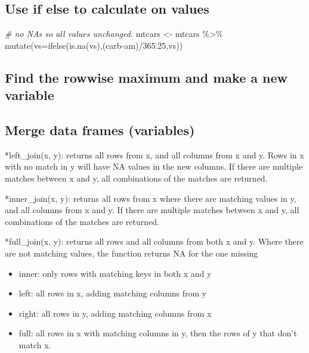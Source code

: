 \documentclass[
]{article}
\newenvironment{Shaded}{\begin{snugshade}}{\end{snugshade}}
\newcommand{\AttributeTok}[1]{\textcolor[rgb]{0.77,0.63,0.00}{#1}}
\newcommand{\CommentTok}[1]{\textcolor[rgb]{0.56,0.35,0.01}{\textit{#1}}}
\newcommand{\FloatTok}[1]{\textcolor[rgb]{0.00,0.00,0.81}{#1}}
\newcommand{\FunctionTok}[1]{\textcolor[rgb]{0.00,0.00,0.00}{#1}}
\newcommand{\NormalTok}[1]{#1}
\newcommand{\OtherTok}[1]{\textcolor[rgb]{0.56,0.35,0.01}{#1}}
\newcommand{\SpecialCharTok}[1]{\textcolor[rgb]{0.00,0.00,0.00}{#1}}
\providecommand{\tightlist}{%
  \setlength{\itemsep}{0pt}\setlength{\parskip}{0pt}}
\begin{document}
\hypertarget{use-if-else-to-calculate-on-values}{%
\subsection{Use if else to calculate on values}\label{use-if-else-to-calculate-on-values}}

\begin{Shaded}
\begin{Highlighting}[]
\CommentTok{\# no NA\textquotesingle{}s so all values unchanged.}
\NormalTok{mtcars }\OtherTok{\textless{}{-}}\NormalTok{ mtcars }\SpecialCharTok{\%\textgreater{}\%} \FunctionTok{mutate}\NormalTok{(}\AttributeTok{vs=}\FunctionTok{ifelse}\NormalTok{(}\FunctionTok{is.na}\NormalTok{(vs),(carb}\SpecialCharTok{{-}}\NormalTok{am)}\SpecialCharTok{/}\FloatTok{365.25}\NormalTok{,vs)) }
\end{Highlighting}
\end{Shaded}

\hypertarget{find-the-rowwise-maximum-and-make-a-new-variable}{%
\subsection{Find the rowwise maximum and make a new variable}\label{find-the-rowwise-maximum-and-make-a-new-variable}}

\hypertarget{merge-data-frames-variables}{%
\subsection{Merge data frames (variables)}\label{merge-data-frames-variables}}

*left\_join(x, y): returns all rows from x, and all columns from x and y. Rows in x with no match in y will have NA values in the new columns. If there are multiple matches between x and y, all combinations of the matches are returned.

*inner\_join(x, y): returns all rows from x where there are matching values in y, and all columns from x and y. If there are multiple matches between x and y, all combinations of the matches are returned.

*full\_join(x, y): returns all rows and all columns from both x and y. Where there are not matching values, the function returns NA for the one missing

\begin{itemize}
\tightlist
\item
  inner: only rows with matching keys in both x and y
\item
  left: all rows in x, adding matching columns from y
\item
  right: all rows in y, adding matching columns from x
\item
  full: all rows in x with matching columns in y, then the rows of y that don't match x.
\end{itemize}
\end{document}
